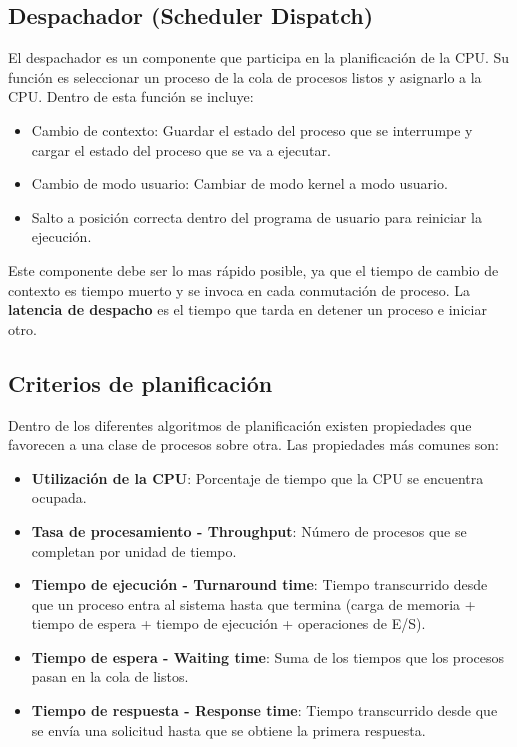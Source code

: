 \documentclass{templateNote}
\begin{document}
\subsection*{Despachador (Scheduler Dispatch)} 
El despachador es un componente que participa en la planificación de la CPU. Su función es seleccionar un proceso de la cola de procesos listos y asignarlo a la CPU. Dentro de esta función se incluye:
\begin{itemize}
    \item Cambio de contexto: Guardar el estado del proceso que se interrumpe y cargar el estado del proceso que se va a ejecutar.
    \item Cambio de modo usuario: Cambiar de modo kernel a modo usuario.
    \item Salto a posición correcta dentro del programa de usuario para reiniciar la ejecución.
\end{itemize}
Este componente debe ser lo mas rápido posible, ya que el tiempo de cambio de contexto es tiempo muerto y se invoca en cada conmutación de proceso.
La \textbf{latencia de despacho} es el tiempo que tarda en detener un proceso e iniciar otro.


\subsection*{Criterios de planificación}
Dentro de los diferentes algoritmos de planificación existen propiedades que favorecen a una clase de procesos sobre otra. Las propiedades más comunes son:
\begin{itemize}
    \item \textbf{Utilización de la CPU}: Porcentaje de tiempo que la CPU se encuentra ocupada.
    \item \textbf{Tasa de procesamiento - Throughput}: Número de procesos que se completan por unidad de tiempo.
    \item \textbf{Tiempo de ejecución - Turnaround time}: Tiempo transcurrido desde que un proceso entra al sistema hasta que termina (carga de memoria + tiempo de espera + tiempo de ejecución + operaciones de E/S).
    \item \textbf{Tiempo de espera - Waiting time}: Suma de los tiempos que los procesos pasan en la cola de listos.
    \item \textbf{Tiempo de respuesta - Response time}: Tiempo transcurrido desde que se envía una solicitud hasta que se obtiene la primera respuesta.
\end{itemize}
\end{document}
